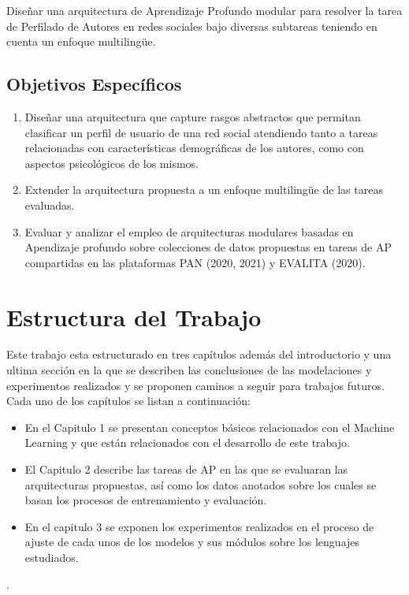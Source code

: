 Diseñar una arquitectura de Aprendizaje Profundo modular para resolver la tarea de Perfilado de Autores en redes sociales bajo diversas subtareas teniendo en cuenta un enfoque multilingüe.
\subsection*{Objetivos Específicos}
\begin{enumerate}
	\item Diseñar una arquitectura que capture rasgos abstractos que permitan clasificar un perfil de usuario de una red social atendiendo tanto a tareas relacionadas con características demográficas de los autores, como con aspectos psicológicos de los mismos.
	\item Extender la arquitectura propuesta a un enfoque multilingüe de las tareas evaluadas.
	\item Evaluar y analizar el empleo de arquitecturas modulares basadas en Apendizaje profundo sobre colecciones de datos propuestas en tareas de AP compartidas en las plataformas PAN (2020, 2021) y EVALITA (2020).
\end{enumerate}

\section*{Estructura del Trabajo}

Este trabajo esta estructurado en tres capítulos además del introductorio y una ultima sección en la que se describen las conclusiones de las modelaciones y experimentos realizados y se proponen  caminos a seguir para trabajos futuros. Cada uno de los capítulos se listan a continuación: 

\begin{itemize}
	\item En el Capitulo 1 se presentan conceptos básicos relacionados con el Machine Learning y que están relacionados con el desarrollo de este trabajo.
	\item El Capitulo 2 describe las tareas de AP en las que se evaluaran las arquitecturas propuestas, así como los datos anotados sobre los cuales se basan los procesos de entrenamiento y evaluación.
	\item En el capitulo 3 se exponen los experimentos realizados en el proceso de ajuste de cada unos de los modelos y sus módulos sobre los lenguajes estudiados. 
\end{itemize}
. 